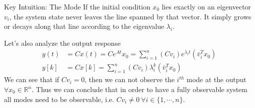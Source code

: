 \documentclass[twoside]{article}
\begin{document}
\begin{conceptbox}{Key Intuition: The Mode}
If the initial condition $x_0$ lies exactly on an eigenvector $v_i$, the system state never leaves the line spanned by that vector. It simply grows or decays along that line according to the eigenvalue $\lambda_i$.
\end{conceptbox}

Let's also analyze the output response
%
\begin{align*}
    y(t) &= C x(t) = C e^{A t} x_0 = \sum\limits_{i=1}^n (C v_i) e^{\lambda_i t} \left( \bar{v}_i^T x_0 \right) 
       \\[1ex]
    y[k] &= C x[k] 
    = \sum\limits_{i=1}^n (C v_i) \lambda_i^k \left( \bar{v}_i^T x_0 \right) 
\end{align*}
%
We can see that if $C v_i = 0$, then we can not observe the $i^{th}$ mode at the output $\forall x_0 \in \mathbb{R}^{n}$. Thus we can conclude that in order to have a fully 
observable system all modes need to be observable, i.e. $C v_i \neq 0 \ \forall i \in \lbrace 1 , \cdots , n \rbrace$.
\end{document}
